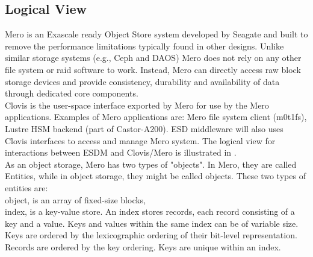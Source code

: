 
\subsection{Logical View}

Mero is an Exascale ready Object Store system developed by Seagate and built to remove the performance limitations typically found in
other designs. Unlike similar storage systems (e.g., Ceph and DAOS) Mero does
not rely on any other file system or raid software to work. Instead, Mero can
directly access raw block storage devices and provide consistency, durability
and availability of data through dedicated core components. \\

Clovis is the user-space interface exported by Mero for use by the Mero
applications.
Examples of Mero applications are: Mero file system client (m0t1fs), Lustre HSM backend (part of Castor-A200).
ESD middleware will also uses Clovis interfaces to access and manage Mero system.
The logical view for interactions between ESDM and Clovis/Mero is illustrated in .
 \\
As an object storage, Mero has two types of "objects". In Mero, they are called
Entities, while in object storage, they might be called objects. These
two types of entities are: \\
object, is an array of fixed-size blocks, \\
index, is a key-value store. An index stores records, each record consisting of
       a key and a value. Keys and values within the same index can be of variable
       size. Keys are ordered by the lexicographic ordering of their bit-level
       representation. Records are ordered by the key ordering. Keys are unique
       within an index.\\

